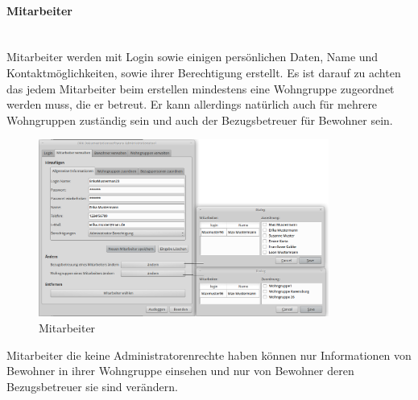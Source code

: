 \paragraph{Mitarbeiter}\mbox{}\\
Mitarbeiter werden mit Login sowie einigen persönlichen Daten, Name und Kontaktmöglichkeiten, sowie ihrer Berechtigung erstellt. Es ist darauf zu achten das jedem Mitarbeiter beim erstellen mindestens eine Wohngruppe zugeordnet werden muss, die er betreut. Er kann allerdings natürlich auch für mehrere Wohngruppen zuständig sein und auch der Bezugsbetreuer für Bewohner sein.
\begin{figure}[h]
	\begin{center}
		\includegraphics[keepaspectratio=true, width=0.85\textwidth]{pics/admin1.png}
		\caption{Mitarbeiter}
		\label{Admindialog Mitarbeiter}
	\end{center}
\end{figure}
\FloatBarrier
\noindent
Mitarbeiter die keine Administratorenrechte haben können nur Informationen von Bewohner in ihrer Wohngruppe einsehen und nur von Bewohner deren Bezugsbetreuer sie sind verändern.
\newpage
